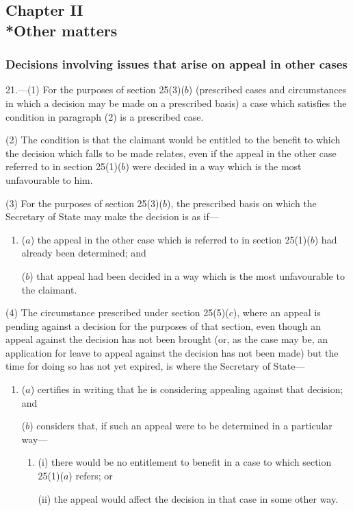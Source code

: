 \documentclass[12pt,a4paper]{article}
\begin{document}
\subsection[Chapter II --- Other matters]{Chapter II\\*Other matters}

\subsubsection[21. Decisions involving issues that arise on appeal in other cases]{Decisions involving issues that arise on appeal in other cases}

\renewcommand\parthead{--- Part III Chapter II}

21.—(1) For the purposes of section 25(3)($b$) (prescribed cases and circumstances in which a decision may be made on a prescribed basis) a case which satisfies the condition in paragraph (2) is a prescribed case.

(2) The condition is that the claimant would be entitled to the benefit to which the decision which falls to be made relates, even if the appeal in the other case referred to in section 25(1)($b$) were decided in a way which is the most unfavourable to him.

(3) For the purposes of section 25(3)($b$), the prescribed basis on which the Secretary of State may make the decision is as if—
\begin{enumerate}\item[]
($a$) the appeal in the other case which is referred to in section 25(1)($b$) had already been determined; and

($b$) that appeal had been decided in a way which is the most unfavourable to the claimant.
\end{enumerate}

(4) The circumstance prescribed under section 25(5)($c$), where an appeal is pending against a decision for the purposes of that section, even though an appeal against the decision has not been brought (or, as the case may be, an application for leave to appeal against the decision has not been made) but the time for doing so has not yet expired, is where the Secretary of State—
\begin{enumerate}\item[]
($a$) certifies in writing that he is considering appealing against that decision; and

($b$) considers that, if such an appeal were to be determined in a particular way—
\begin{enumerate}\item[]
(i) there would be no entitlement to benefit in a case to which section 25(1)($a$) refers; or

(ii) the appeal would affect the decision in that case in some other way.
\end{enumerate}
\end{enumerate}
\end{document}
